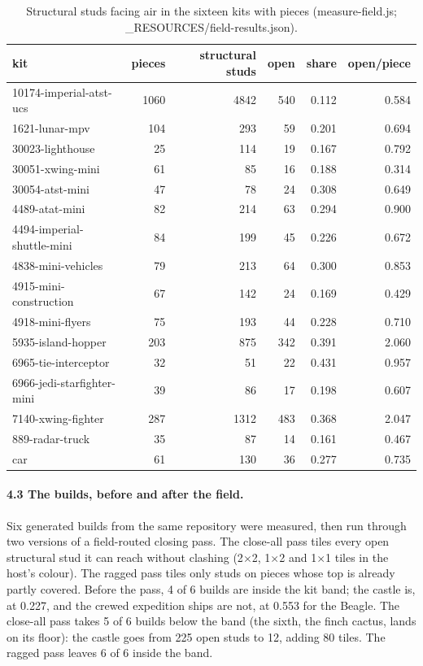 \documentclass[11pt,a4paper]{article}
\begin{document}
\begin{table}[h]\centering\footnotesize\begin{tabular}{lrrrrr}\toprule kit & pieces & structural studs & open & share & open/piece\\\midrule
10174-imperial-atst-ucs & 1060 & 4842 & 540 & 0.112 & 0.584\\
1621-lunar-mpv & 104 & 293 & 59 & 0.201 & 0.694\\
30023-lighthouse & 25 & 114 & 19 & 0.167 & 0.792\\
30051-xwing-mini & 61 & 85 & 16 & 0.188 & 0.314\\
30054-atst-mini & 47 & 78 & 24 & 0.308 & 0.649\\
4489-atat-mini & 82 & 214 & 63 & 0.294 & 0.900\\
4494-imperial-shuttle-mini & 84 & 199 & 45 & 0.226 & 0.672\\
4838-mini-vehicles & 79 & 213 & 64 & 0.300 & 0.853\\
4915-mini-construction & 67 & 142 & 24 & 0.169 & 0.429\\
4918-mini-flyers & 75 & 193 & 44 & 0.228 & 0.710\\
5935-island-hopper & 203 & 875 & 342 & 0.391 & 2.060\\
6965-tie-interceptor & 32 & 51 & 22 & 0.431 & 0.957\\
6966-jedi-starfighter-mini & 39 & 86 & 17 & 0.198 & 0.607\\
7140-xwing-fighter & 287 & 1312 & 483 & 0.368 & 2.047\\
889-radar-truck & 35 & 87 & 14 & 0.161 & 0.467\\
car & 61 & 130 & 36 & 0.277 & 0.735\\\bottomrule\end{tabular}\caption{Structural studs facing air in the sixteen kits with pieces (measure-field.js; \_RESOURCES/field-results.json).}\end{table}
\paragraph{4.3 The builds, before and after the field.} Six generated builds from the same repository were measured, then run through two versions of a field-routed closing pass. The close-all pass tiles every open structural stud it can reach without clashing (2$\times$2, 1$\times$2 and 1$\times$1 tiles in the host's colour). The ragged pass tiles only studs on pieces whose top is already partly covered. Before the pass, 4 of 6 builds are inside the kit band; the castle is, at 0.227, and the crewed expedition ships are not, at 0.553 for the Beagle. The close-all pass takes 5 of 6 builds below the band (the sixth, the finch cactus, lands on its floor): the castle goes from 225 open studs to 12, adding 80 tiles. The ragged pass leaves 6 of 6 inside the band.
\end{document}
